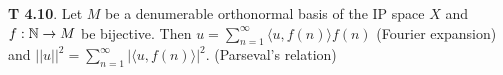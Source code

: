 {\bf T 4.10}. Let $M$ be a denumerable orthonormal basis of the IP space $X$ and $f: \mathbb{N}\rightarrow M$ be bijective.  Then $u = \sum_{n=1}^{\infty}\langle u,f(n)\rangle f(n)$ (Fourier expansion) and $||u||^2 =  \sum_{n=1}^{\infty}|\langle u,f(n)\rangle|^2$. (Parseval's relation)
